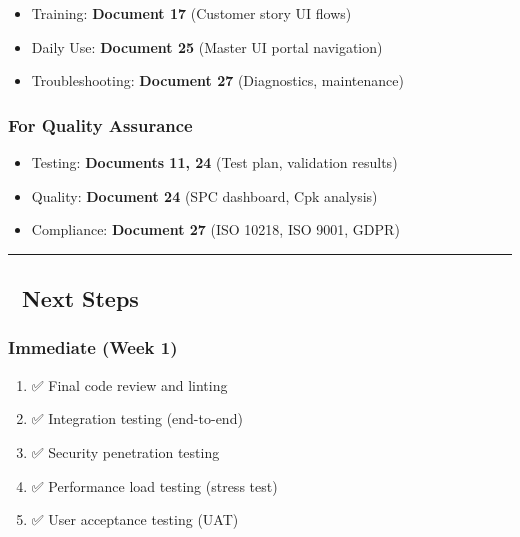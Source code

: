 \documentclass[
]{article}
\providecommand{\tightlist}{%
  \setlength{\itemsep}{0pt}\setlength{\parskip}{0pt}}
\begin{document}
\begin{itemize}
\tightlist
\item
  Training: \textbf{Document 17} (Customer story UI flows)
\item
  Daily Use: \textbf{Document 25} (Master UI portal navigation)
\item
  Troubleshooting: \textbf{Document 27} (Diagnostics, maintenance)
\end{itemize}

\hypertarget{for-quality-assurance}{%
\subsubsection{For Quality Assurance}\label{for-quality-assurance}}

\begin{itemize}
\tightlist
\item
  Testing: \textbf{Documents 11, 24} (Test plan, validation results)
\item
  Quality: \textbf{Document 24} (SPC dashboard, Cpk analysis)
\item
  Compliance: \textbf{Document 27} (ISO 10218, ISO 9001, GDPR)
\end{itemize}

\begin{center}\rule{0.5\linewidth}{0.5pt}\end{center}

\hypertarget{next-steps}{%
\subsection{🎯 Next Steps}\label{next-steps}}

\hypertarget{immediate-week-1}{%
\subsubsection{Immediate (Week 1)}\label{immediate-week-1}}

\begin{enumerate}
\def\labelenumi{\arabic{enumi}.}
\tightlist
\item
  ✅ Final code review and linting
\item
  ✅ Integration testing (end-to-end)
\item
  ✅ Security penetration testing
\item
  ✅ Performance load testing (stress test)
\item
  ✅ User acceptance testing (UAT)
\end{enumerate}
\end{document}
